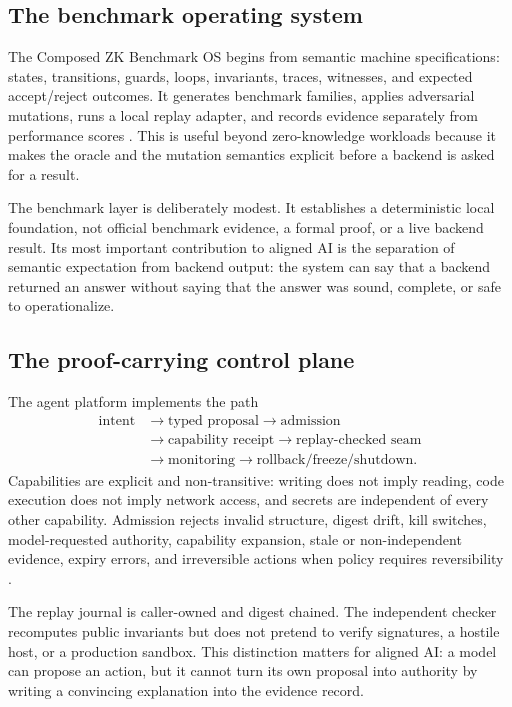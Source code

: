 \documentclass[11pt,twoside]{article}
\newcommand{\sourcecite}[1]{\parencite{#1}}
\begin{document}
\subsection{The benchmark operating system}

  The Composed ZK Benchmark OS begins from semantic machine specifications: states, transitions, guards, loops, invariants, traces, witnesses, and expected accept/reject outcomes. It generates benchmark families, applies adversarial mutations, runs a local replay adapter, and records evidence separately from performance scores \sourcecite{repoREADME2026}. This is useful beyond zero-knowledge workloads because it makes the oracle and the mutation semantics explicit before a backend is asked for a result.

  The benchmark layer is deliberately modest. It establishes a deterministic local foundation, not official benchmark evidence, a formal proof, or a live backend result. Its most important contribution to aligned AI is the separation of semantic expectation from backend output: the system can say that a backend returned an answer without saying that the answer was sound, complete, or safe to operationalize.

\subsection{The proof-carrying control plane}

  The agent platform implements the path
\[
\begin{aligned}
  \text{intent} &\rightarrow \text{typed proposal} \rightarrow \text{admission} \\
  &\rightarrow \text{capability receipt} \rightarrow \text{replay-checked seam} \\
  &\rightarrow \text{monitoring} \rightarrow \text{rollback/freeze/shutdown}.
\end{aligned}
\]
  Capabilities are explicit and non-transitive: writing does not imply reading, code execution does not imply network access, and secrets are independent of every other capability. Admission rejects invalid structure, digest drift, kill switches, model-requested authority, capability expansion, stale or non-independent evidence, expiry errors, and irreversible actions when policy requires reversibility \sourcecite{repoHSAI2026}.

  The replay journal is caller-owned and digest chained. The independent checker recomputes public invariants but does not pretend to verify signatures, a hostile host, or a production sandbox. This distinction matters for aligned AI: a model can propose an action, but it cannot turn its own proposal into authority by writing a convincing explanation into the evidence record.
\end{document}
